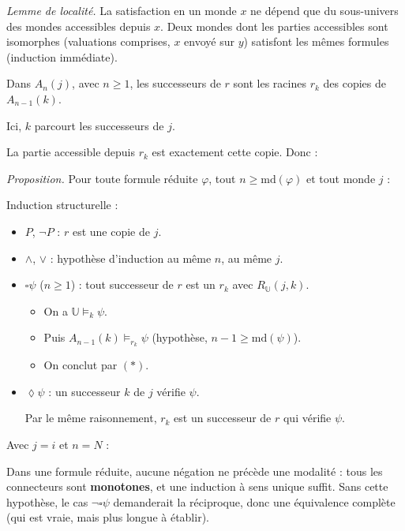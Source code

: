 \documentclass[11pt,a4paper]{article}
\providecommand{\tightlist}{\setlength{\itemsep}{0pt}\setlength{\parskip}{0pt}}
\providecommand{\Box}{\square}
\providecommand{\Diamond}{\lozenge}
\newcommand{\equationajustee}[1]{%
  \sbox{\boiteequation}{$\displaystyle #1$}%
  \ifdim\wd\boiteequation>\linewidth
    \[\resizebox{\linewidth}{!}{\usebox{\boiteequation}}\]%
  \else
    \[#1\]%
  \fi}
\begin{document}
\emph{Lemme de localité.} La satisfaction en un monde \(x\) ne dépend que du sous-univers des mondes accessibles depuis \(x\). Deux mondes dont les parties accessibles sont isomorphes (valuations comprises, \(x\) envoyé sur \(y\)) satisfont les mêmes formules (induction immédiate).

Dans \(A_n(j)\), avec \(n\ge1\), les successeurs de \(r\) sont les racines \(r_k\) des copies de \(A_{n-1}(k)\).

Ici, \(k\) parcourt les successeurs de \(j\).

La partie accessible depuis \(r_k\) est exactement cette copie. Donc :

\equationajustee{A_n(j)\models_{r_k}\psi\iff A_{n-1}(k)\models_{r_k}\psi.\qquad(\ast)}

\emph{Proposition.} Pour toute formule réduite \(\varphi\), tout \(n\ge\mathrm{md}(\varphi)\) et tout monde \(j\) :

\equationajustee{\mathbb U\models_j\varphi\Rightarrow A_n(j)\models_r\varphi.}

Induction structurelle :

\begin{itemize}
\item
  \(P\), \(\neg P\) : \(r\) est une copie de \(j\).
\item
  \(\wedge\), \(\vee\) : hypothèse d'induction au même \(n\), au même \(j\).
\item
  \(\Box\psi\) (\(n\ge1\)) : tout successeur de \(r\) est un \(r_k\) avec \(R_{\mathbb U}(j,k)\).

  \begin{itemize}
  \tightlist
  \item
    On a \(\mathbb U\models_k\psi\).
  \item
    Puis \(A_{n-1}(k)\models_{r_k}\psi\) (hypothèse, \(n-1\ge\mathrm{md}(\psi)\)).
  \item
    On conclut par \((\ast)\).
  \end{itemize}
\item
  \(\Diamond\psi\) : un successeur \(k\) de \(j\) vérifie \(\psi\).

  Par le même raisonnement, \(r_k\) est un successeur de \(r\) qui vérifie \(\psi\).
\end{itemize}

Avec \(j=i\) et \(n=N\) :

\equationajustee{\mathbb U\models_i\varphi\Rightarrow\mathbb A\models_r\varphi.}

\begin{methode}

Dans une formule réduite, aucune négation ne précède une modalité : tous les connecteurs sont \textbf{monotones}, et une induction à sens unique suffit. Sans cette hypothèse, le cas \(\neg\Box\psi\) demanderait la réciproque, donc une équivalence complète (qui est vraie, mais plus longue à établir).

\end{methode}
\end{document}
